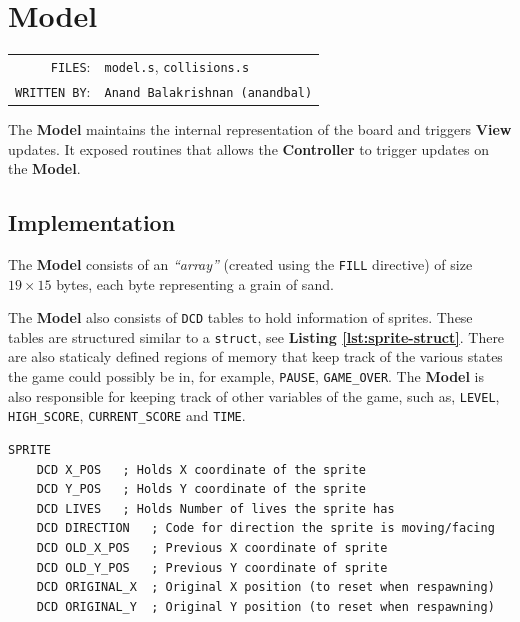   \section{Model}

  \begin{table}[H]
  \begin{tabular}{rl}
    \texttt{FILES}:         &\texttt{model.s}, \texttt{collisions.s} \\
    \texttt{WRITTEN BY}:    &\texttt{Anand Balakrishnan (anandbal)}
  \end{tabular}
  \end{table}

  The \textbf{Model} maintains the internal representation of the board and triggers \textbf{View} updates. It exposed routines that allows the
  \textbf{Controller} to trigger updates on the \textbf{Model}.

    \subsection{Implementation}

    The \textbf{Model} consists of an \emph{``array''} (created using the \texttt{FILL} directive)
    of size $19 \times 15$ bytes, each byte representing a grain of sand.

    The \textbf{Model} also consists of \texttt{DCD} tables to hold information of sprites. These tables are structured similar to a \texttt{struct}, see \textbf{Listing \ref{lst:sprite-struct}}.
    There are also staticaly defined regions of memory that keep track of the various states the game could possibly be in,
    for example, \texttt{PAUSE}, \texttt{GAME\_OVER}.
    The \textbf{Model} is also responsible for keeping track of other variables of the game,
    such as, \texttt{LEVEL}, \texttt{HIGH\_SCORE}, \texttt{CURRENT\_SCORE} and \texttt{TIME}.


    \begin{lstlisting}[caption={Structure for \texttt{SPRITE} data},label={lst:sprite-struct}]
SPRITE
	DCD X_POS	; Holds X coordinate of the sprite
	DCD Y_POS	; Holds Y coordinate of the sprite
	DCD LIVES	; Holds Number of lives the sprite has
	DCD DIRECTION	; Code for direction the sprite is moving/facing
	DCD OLD_X_POS	; Previous X coordinate of sprite
	DCD OLD_Y_POS	; Previous Y coordinate of sprite
	DCD ORIGINAL_X	; Original X position (to reset when respawning)
	DCD ORIGINAL_Y	; Original Y position (to reset when respawning)

    \end{lstlisting}

